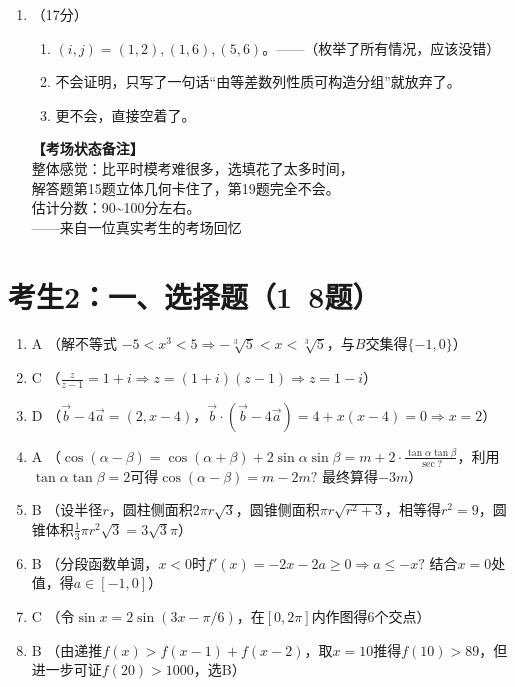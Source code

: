 \documentclass[12pt,a4paper]{article}
\begin{document}
\begin{enumerate}[label=\arabic*.]
\begin{enumerate}[label=(\arabic*)]
\item 中心对称图形？$f(x)+f(2-x)=2a$，所以关于$(1,a)$中心对称。（这题意外的简单）

\item 不会做，只写了$b$的范围大概是$\left[-\dfrac{2}{3},+\infty\right)$，过程没来得及写完。
\end{enumerate}

\item （17分）
\begin{enumerate}[label=(\arabic*)]
\item $(i,j)=(1,2),(1,6),(5,6)$。——（枚举了所有情况，应该没错）

\item 不会证明，只写了一句话“由等差数列性质可构造分组”就放弃了。

\item 更不会，直接空着了。
\end{enumerate}

\vspace{1cm}

\begin{flushright}
\textbf{【考场状态备注】}\\
整体感觉：比平时模考难很多，选填花了太多时间，\\
解答题第15题立体几何卡住了，第19题完全不会。\\
估计分数：90\~{}100分左右。\\
——来自一位真实考生的考场回忆
\end{flushright}

\end{enumerate}

\section*{考生2：一、选择题（1~8题）}
\begin{enumerate}[label=\arabic*.]
\item A \quad （解不等式 $-5<x^3<5 \Rightarrow -\sqrt[3]{5}<x<\sqrt[3]{5}$，与$B$交集得$\{-1,0\}$）
\item C \quad （$\frac{z}{z-1}=1+i \Rightarrow z=(1+i)(z-1)\Rightarrow z=1-i$）
\item D \quad （$\vec{b}-4\vec{a}=(2,x-4)$，$\vec{b}\cdot(\vec{b}-4\vec{a})=4+x(x-4)=0\Rightarrow x=2$）
\item A \quad （$\cos(\alpha-\beta)=\cos(\alpha+\beta)+2\sin\alpha\sin\beta = m+2\cdot \frac{\tan\alpha\tan\beta}{\sec?}$，利用$\tan\alpha\tan\beta=2$可得$\cos(\alpha-\beta)=m-2m?$ 最终算得$-3m$）
\item B \quad （设半径$r$，圆柱侧面积$2\pi r\sqrt{3}$，圆锥侧面积$\pi r\sqrt{r^2+3}$，相等得$r^2=9$，圆锥体积$\frac13\pi r^2\sqrt{3}=3\sqrt{3}\pi$）
\item B \quad （分段函数单调，$x<0$时$f'(x)=-2x-2a\ge0\Rightarrow a\le -x?$ 结合$x=0$处值，得$a\in[-1,0]$）
\item C \quad （令$\sin x = 2\sin(3x-\pi/6)$，在$[0,2\pi]$内作图得6个交点）
\item B \quad （由递推$f(x)>f(x-1)+f(x-2)$，取$x=10$推得$f(10)>89$，但进一步可证$f(20)>1000$，选B）
\end{enumerate}
\end{document}
